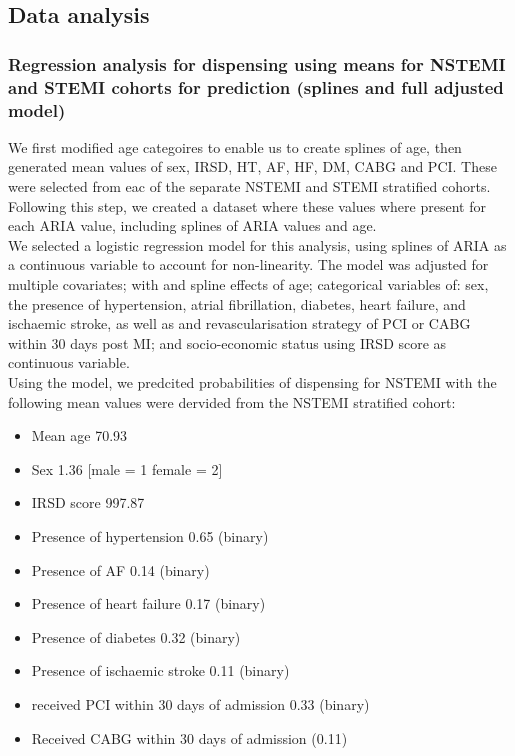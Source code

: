 \documentclass[11pt]{article}
\begin{document}
\subsection{Data analysis}
\subsubsection{Regression analysis for dispensing using means for NSTEMI and STEMI cohorts for prediction (splines and full adjusted model)}
We first modified age categoires to enable us to create splines of age, then generated mean values of sex, IRSD, HT, AF, HF, DM, CABG and PCI. These were selected from eac of the separate NSTEMI and STEMI stratified cohorts. Following this step, we created a dataset where these values where present for each ARIA value, including splines of ARIA values and age.\\
We selected a logistic regression model for this analysis, using splines of ARIA as a continuous variable to account for non-linearity. The model was adjusted for multiple covariates; with and spline effects of age; categorical variables of: sex, the presence of hypertension, atrial fibrillation, diabetes, heart failure, and ischaemic stroke, as well as and revascularisation strategy of PCI or CABG within 30 days post MI; and socio-economic status using IRSD score as continuous variable. \\
Using the model, we predcited probabilities of dispensing for NSTEMI with the following mean values were dervided from the NSTEMI stratified cohort: \\
\begin{itemize}
\item Mean age 70.93
\item Sex 1.36 [male = 1 female = 2]
\item IRSD score 997.87
\item Presence of hypertension 0.65 (binary)
\item Presence of AF 0.14 (binary)
\item Presence of heart failure 0.17 (binary)
\item Presence of diabetes 0.32 (binary)
\item Presence of ischaemic stroke 0.11 (binary)
\item received PCI within 30 days of admission 0.33 (binary)
\item Received CABG within 30 days of admission (0.11)
\end{itemize}
\end{document}
